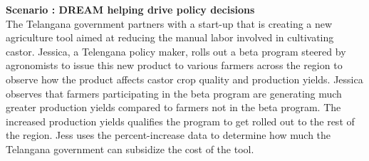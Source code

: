 \begin{flushleft}
\textbf{Scenario : DREAM helping drive policy decisions}\\\smallskip
The Telangana government partners with a start-up that is creating a new agriculture tool aimed at reducing the manual labor involved in cultivating castor. Jessica, a Telengana policy maker, rolls out a beta program steered by agronomists to issue this new product to various farmers across the region to observe how the product affects castor crop quality and production yields. Jessica observes that farmers participating in the beta program are generating much greater production yields compared to farmers not in the beta program. The increased production yields qualifies the program to get rolled out to the rest of the region. Jess uses the percent-increase data to determine how much the Telangana government can subsidize the cost of the tool. 
\end{flushleft}

